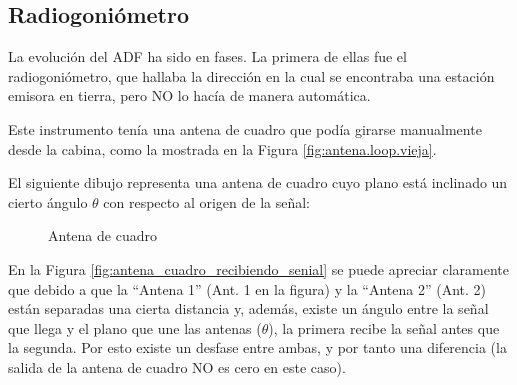 \subsection{Radiogoni\'ometro}

La evoluci\'on del ADF ha sido en fases. La primera de ellas fue el radiogoni\'ometro, que hallaba la direcci\'on en la cual se encontraba una estaci\'on emisora en tierra, pero NO lo hac\'ia de manera autom\'atica.

Este instrumento ten\'ia una antena de cuadro que pod\'ia girarse manualmente desde la cabina, como la mostrada en la Figura \ref{fig:antena.loop.vieja}.

El siguiente dibujo representa una antena de cuadro cuyo plano est\'a inclinado un cierto \'angulo $\theta$ con respecto al origen de la se\~nal:


\begin{figure}[!h]
  \centering
{}
  \caption{Antena de cuadro}
\end{figure}


En la Figura \ref{fig:antena_cuadro_recibiendo_senial} se puede apreciar claramente que debido a que la ``Antena 1'' (Ant. 1 en la figura) y la ``Antena 2'' (Ant. 2) est\'an separadas una cierta distancia y, adem\'as, existe un \'angulo entre la se\~nal que llega y el plano que une las antenas ($\theta$), la primera recibe la se\~nal antes que la segunda. Por esto existe un desfase entre ambas, y por tanto una diferencia (la salida de la antena de cuadro NO es cero en este caso).

